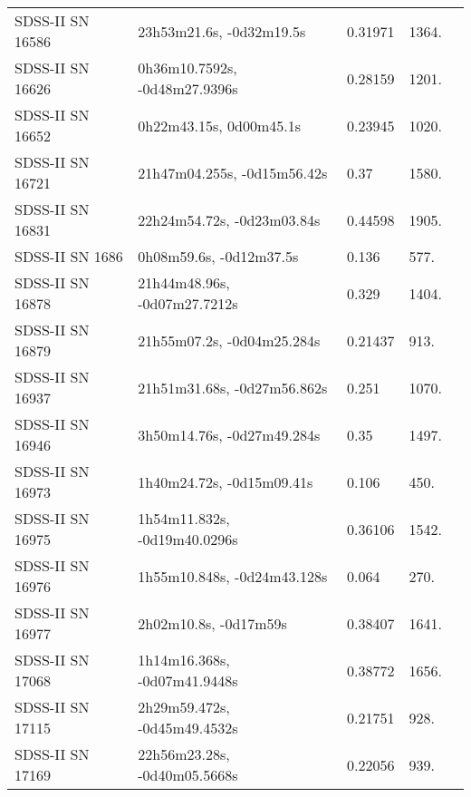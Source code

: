 \begin{longtable}{lllll}
 SDSS-II SN 16586 &       23h53m21.6s, -0d32m19.5s &  0.31971 &          1364. &    \citet{2016SDSSD.C...0000:} \\
 SDSS-II SN 16626 &  0h36m10.7592s, -0d48m27.9396s &  0.28159 &          1201. &    \citet{2016SDSSD.C...0000:} \\
 SDSS-II SN 16652 &        0h22m43.15s, 0d00m45.1s &  0.23945 &          1020. &    \citet{2016SDSSD.C...0000:} \\
 SDSS-II SN 16721 &    21h47m04.255s, -0d15m56.42s &     0.37 &          1580. &    \citet{2011ApJ...738..162S} \\
 SDSS-II SN 16831 &     22h24m54.72s, -0d23m03.84s &  0.44598 &          1905. &    \citet{2016SDSSD.C...0000:} \\
  SDSS-II SN 1686 &        0h08m59.6s, -0d12m37.5s &    0.136 &           577. &    \citet{2008AJ....135..348S} \\
 SDSS-II SN 16878 &   21h44m48.96s, -0d07m27.7212s &    0.329 &          1404. &    \citet{2011ApJ...738..162S} \\
 SDSS-II SN 16879 &     21h55m07.2s, -0d04m25.284s &  0.21437 &           913. &    \citet{2016SDSSD.C...0000:} \\
 SDSS-II SN 16937 &    21h51m31.68s, -0d27m56.862s &    0.251 &          1070. &    \citet{2011ApJ...738..162S} \\
 SDSS-II SN 16946 &     3h50m14.76s, -0d27m49.284s &     0.35 &          1497. &    \citet{2011ApJ...738..162S} \\
 SDSS-II SN 16973 &      1h40m24.72s, -0d15m09.41s &    0.106 &           450. &    \citet{2011ApJ...738..162S} \\
 SDSS-II SN 16975 &   1h54m11.832s, -0d19m40.0296s &  0.36106 &          1542. &    \citet{2016SDSSD.C...0000:} \\
 SDSS-II SN 16976 &    1h55m10.848s, -0d24m43.128s &    0.064 &           270. &    \citet{2011ApJ...738..162S} \\
 SDSS-II SN 16977 &          2h02m10.8s, -0d17m59s &  0.38407 &          1641. &    \citet{2016SDSSD.C...0000:} \\
 SDSS-II SN 17068 &   1h14m16.368s, -0d07m41.9448s &  0.38772 &          1656. &    \citet{2016SDSSD.C...0000:} \\
 SDSS-II SN 17115 &   2h29m59.472s, -0d45m49.4532s &  0.21751 &           928. &    \citet{2016SDSSD.C...0000:} \\
 SDSS-II SN 17169 &   22h56m23.28s, -0d40m05.5668s &  0.22056 &           939. &    \citet{2016SDSSD.C...0000:} \\

\end{longtable}
